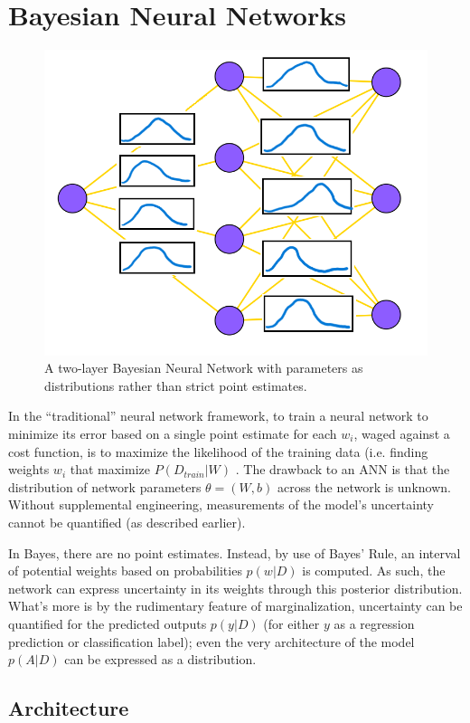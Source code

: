\chapter{Bayesian Neural Networks}

\begin{figure}
  \vspace{-40pt}
    \centering
    \includegraphics[width=.35\textwidth]{Figures/BNN_weightstoc.png}
    \caption{\footnotesize{A two-layer Bayesian Neural Network with parameters as distributions rather than strict point estimates.}}
  \label{BayesNet}
  \vspace{-10pt}
\end{figure}

 In the ``traditional'' neural network framework, to train a neural network to minimize its error based on a single point estimate for each $w_i$, waged against a cost function, is to maximize the likelihood of the training data (i.e. finding weights $w_i$ that maximize $P(D_{train}|W)$ \cite{bishop1995} \cite{bishop1997bayesian}.  The drawback to an ANN is that the distribution of network parameters $\theta = (W,b)$ across the network is unknown. \cite{mullachery2018bayesian}  Without supplemental engineering, measurements of the model's uncertainty cannot be quantified (as described earlier).
 
 In Bayes, there are no point estimates. Instead, by use of Bayes’ Rule, an interval of potential weights based on probabilities $p(w|D)$ is computed.  As such, the network can express uncertainty in its weights through this posterior distribution.  What's more is by the rudimentary feature of marginalization, uncertainty can be quantified for the predicted outputs $p(y|D)$ (for either $y$ as a regression prediction or classification label); even the very architecture of the model $p(A|D)$ can be expressed as a distribution. \cite{bishop1995}
 

\section{Architecture}

